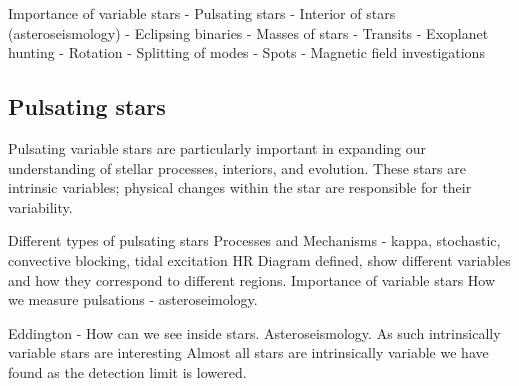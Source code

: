 Importance of variable stars
    - Pulsating stars
        - Interior of stars (asteroseismology)
    - Eclipsing binaries
        - Masses of stars
    - Transits
        - Exoplanet hunting
    - Rotation
        - Splitting of modes
        - Spots
        - Magnetic field investigations

\subsection{Pulsating stars}

Pulsating variable stars are particularly important in expanding our understanding of stellar processes, interiors, and evolution. These stars are intrinsic variables; physical changes within the star are responsible for their variability. 

Different types of pulsating stars
Processes and Mechanisms - kappa, stochastic, convective blocking, tidal excitation
HR Diagram defined, show different variables and how they correspond to different regions.
Importance of variable stars
How we measure pulsations - asteroseimology.

Eddington - How can we see inside stars.
Asteroseismology. As such intrinsically variable stars are interesting
Almost all stars are intrinsically variable we have found as the detection limit is lowered.







